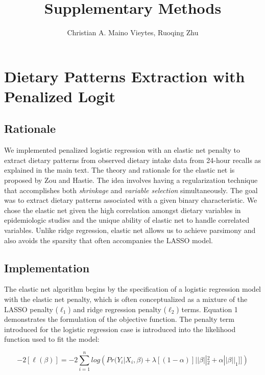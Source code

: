 \documentclass{article}
\title{Supplementary Methods}
\author{Christian A. Maino Vieytes, Ruoqing Zhu}
\date{}
\begin{document}
\maketitle
{}

\tableofcontents


\section{Dietary Patterns Extraction with Penalized Logit}
\subsection{Rationale}
\hspace{\parindent} We implemented penalized logistic regression with an elastic net penalty to extract dietary patterns from observed dietary intake data from 24-hour recalls as explained in the main text. The theory and rationale for the elastic net is proposed by Zou and Hastie. \supercite{zou2005regularization} The idea involves having a regularization technique that accomplishes both \textit{shrinkage} and \textit{variable selection} simultaneously. The goal was to extract dietary patterns associated with a given binary characteristic. We chose the elastic net given the high correlation amongst dietary variables in epidemiologic studies and the unique ability of elastic net to handle correlated variables. Unlike ridge regression, elastic net allows us to achieve parsimony and also avoids the sparsity that often accompanies the LASSO model.\supercite{zou2005regularization}

\subsection{Implementation}
 \hspace{\parindent}The elastic net algorithm begins by the specification of a logistic regression model with the elastic net penalty, which is often conceptualized as a mixture of the LASSO penalty ($\ell_1$) and ridge regression penalty ($\ell_2$)  terms. Equation 1 demonstrates the formulation of the objective function. The penalty term introduced for the logistic regression case is introduced into the likelihood function used to fit the model:

\begin{equation}
	-2[\ell(\beta)]=-2\sum_{i=1}^nlog({Pr(Y_i|X_i,\beta)+\lambda[(1-\alpha)]||\beta||_2^2+\alpha||\beta||_1]]}) \tag{1}
\end{equation}
\end{document}
